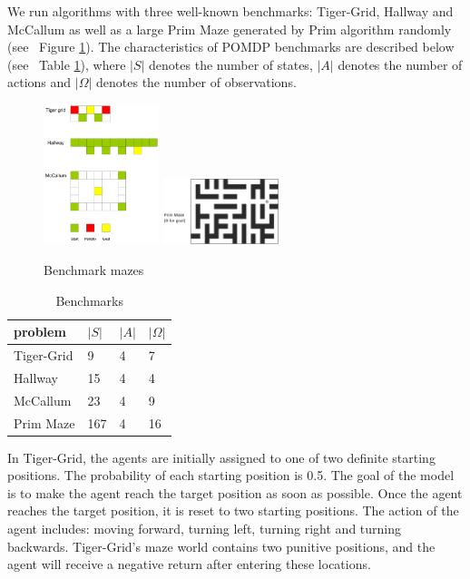 \documentclass{article}
\begin{document}
We run algorithms with three well-known benchmarks: Tiger-Grid, Hallway and McCallum 
as well as a large Prim Maze generated by Prim algorithm randomly
(see ~Figure \ref{fig:mazes}). The characteristics of POMDP benchmarks are described
below (see ~Table \ref{table:benchmarks}), where $|S|$ denotes the number of states,
$|A|$ denotes the number of actions and $|\Omega|$ denotes the number of observations.

\begin{figure}[h]
  \centering
    \includegraphics[width=0.30\textwidth]{mazes.png}
    \includegraphics[width=0.30\textwidth]{06-13-21-48/prim_maze_with_caption.png}
  \caption{Benchmark mazes}
  \label{fig:mazes}
\end{figure}

\begin{table}[h]
  \caption{Benchmarks}
  \label{table:benchmarks}
  \centering
  \begin{tabular}{llll}
    \toprule
    problem         & $|S|$           & $|A|$          & $|\Omega|$\\
    \midrule
    Tiger-Grid      & 9              & 4              & 7        \\
    Hallway         & 15           & 4              & 4        \\
    McCallum        & 23              & 4              & 9        \\
    Prim Maze        & 167              & 4              & 16        \\
    \bottomrule
  \end{tabular}
\end{table}

In Tiger-Grid, the agents are initially assigned to one of two definite starting positions.
The probability of each starting position is 0.5. The goal of the model is to make the agent
reach the target position as soon as possible. Once the agent reaches the target position,
it is reset to two starting positions. The action of the agent includes: moving forward, turning left,
turning right and turning backwards. Tiger-Grid's maze world contains two punitive positions,
and the agent will receive a negative return after entering these locations. 
\end{document}
